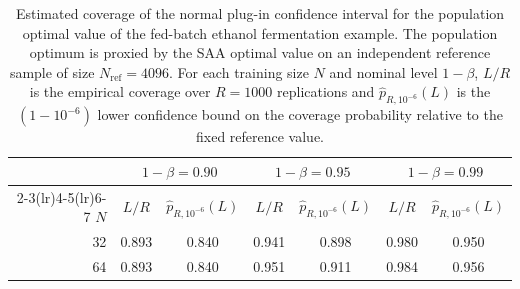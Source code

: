 \begin{table}[t]
  \centering
  \caption{Estimated coverage of the normal plug-in confidence interval for the population optimal value of the fed-batch ethanol fermentation example. The population optimum is proxied by the SAA optimal value on an independent reference sample of size $N_{\mathrm{ref}}=4096$. For each training size $N$ and nominal level $1-\beta$, $L/R$ is the empirical coverage over $R=1000$ replications and $\widehat p_{R,10^{-6}}(L)$ is the $(1-10^{-6})$ lower confidence bound on the coverage probability relative to the fixed reference value.}
  \begin{tabular}{rcccccc}
    \toprule
     & \multicolumn{2}{c}{$1-\beta = 0.90$} & \multicolumn{2}{c}{$1-\beta = 0.95$} & \multicolumn{2}{c}{$1-\beta = 0.99$} \\
    \cmidrule(lr){2-3}\cmidrule(lr){4-5}\cmidrule(lr){6-7}
    $N$ & $L/R$ & $\widehat p_{R,10^{-6}}(L)$ & $L/R$ & $\widehat p_{R,10^{-6}}(L)$ & $L/R$ & $\widehat p_{R,10^{-6}}(L)$ \\
    \midrule
    32 & 0.893 & 0.840 & 0.941 & 0.898 & 0.980 & 0.950 \\
    64 & 0.893 & 0.840 & 0.951 & 0.911 & 0.984 & 0.956 \\
    \bottomrule
  \end{tabular}
  \label{table:ethanol-coverage}
\end{table}
